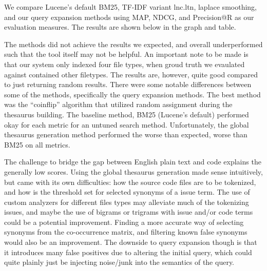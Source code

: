 \documentclass[10pt,a4paper]{article}
\begin{document}
We compare Lucene’s default BM25, TF-IDF variant lnc.ltn, laplace smoothing, and our query expansion methods using MAP, NDCG, and Precision@R as our evaluation measures. The results are shown below in the graph and table. 

The methods did not achieve the results we expected, and overall underperformed such that the tool itself may not be helpful. An important note to be made is that our system only indexed four file types, when groud truth we evaulated against contained other filetypes. The results are, however, quite good compared to just returning random results. There were some notable differences between some of the methods, specifically the query expansion methods. The best method was the “coinflip” algorithm that utilized random assignment during the thesaurus building. The baseline method, BM25 (Lucene’s default) performed okay for each metric for an untuned search method. Unfortunately, the global thesaurus generation method performed the worse than expected, worse than BM25 on all metrics.

The challenge to bridge the gap between English plain text and code explains the generally low scores. Using the global thesaurus generation made sense intuitively, but came with its own difficulties: how the source code files are to be tokenized, and how is the threshold set for selected synonyms of a issue term. The use of custom analyzers for different files types may alleviate much of the tokenizing issues, and maybe the use of bigrams or trigrams with issue and/or code terms could be a potential improvement. Finding a more accurate way of selecting synonyms from the co-occurrence matrix, and filtering known false synonyms would also be an improvement. The downside to query expansion though is that it introduces many false positives due to altering the initial query, which could quite plainly just be injecting noise/junk into the semantics of the query.
\end{document}
